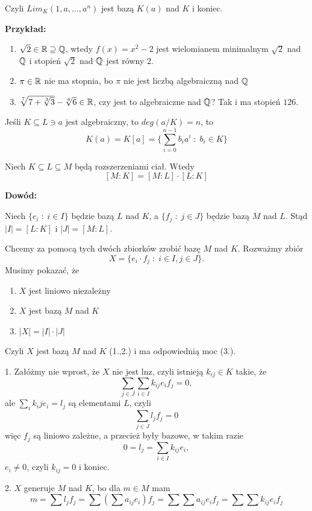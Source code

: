 Czyli $Lim_K(1,a,...,a^n)$ jest bazą $K(a)$ nad $K$ i koniec.

\textbf{Przykład:}
\begin{enumerate}
    \item $\sqrt{2}\in\mathbb{R}\supseteq\mathbb{Q}$, wtedy $f(x)=x^2-2$ jest wielomianem minimalnym $\sqrt2$ nad $\mathbb{Q}$ i stopień $\sqrt{2}$ nad $\mathbb{Q}$ jest równy $2$.
    \item $\pi\in\mathbb{R}$ nie ma stopnia, bo $\pi$ nie jest liczbą algebraiczną nad $\mathbb{Q}$
    \item  $\sqrt[7]{7+\sqrt[3]{3}}-\sqrt[6]{6}\in\mathbb{R}$, czy jest to algebraiczne nad $\mathbb{Q}$? Tak i ma stopień $126$.
\end{enumerate}

Jeśli $K\subseteq L\ni a$ jest algebraiczny, to $deg(a/K)=n$, to 
$$K(a)=K[a]=\{\sum\limits_{i=0}^{n-1}b_ia^i\;:\;b_i\in K\}$$

\begin{fakt}[$dim_K(M)=dim_L(M)\cdot dim_K(L)$]\label{fakt:4:5}
    Niech $K\subseteq L\subseteq M$ będą rozszerzeniami ciał. Wtedy 
    $$[M:K]=[M:L]\cdot [L:K]$$
\end{fakt}

\textbf{Dowód:}

Niech $\{e_i\;:\;i\in I\}$ będzie bazą $L$ nad $K$, a $\{f_j\;:\;j\in J\}$ będzie bazą $M$ nad $L$. Stąd $|I|=[L:K]$ i $|J|=[M:L]$.

Chcemy za pomocą tych dwóch zbiorków zrobić bazę $M$ nad $K$. Rozważmy zbiór
$$X=\{e_i\cdot f_j\;:\;i\in I,j\in J\}.$$
Musimy pokazać, że 
\begin{enumerate}
    \item $X$ jest liniowo niezależny
    \item $X$ jest bazą $M$ nad $K$
    \item $|X|=|I|\cdot|J|$
\end{enumerate}

Czyli $X$ jest bazą $M$ nad $K$ (1.,2.) i ma odpowiednią moc (3.).

1. Załóżmy nie wprost, że $X$ nie jest lnz, czyli istnieją $k_{ij}\in K$ takie, że
$$\sum\limits_{j\in J}\sum\limits_{i\in I}k_{ij}e_if_j=0,$$
ale $\sum\limits_ik_ije_i=l_j$ są elementami $L$, czyli
$$\sum\limits_{j\in J}l_jf_j=0$$
więc $f_j$ są liniowo zależne, a przecież były bazowe, w takim razie
$$0=l_j=\sum\limits_{i\in I}k_{ij}e_i,$$
$e_i\neq0$, czyli $k_{ij}=0$ i koniec.

2. $X$ generuje $M$ nad $K$, bo dla $m\in M$ mam
$$m=\sum l_jf_j=\sum\left(\sum a_{ij}e_i\right)f_j=\sum\sum a_{ij}e_if_j=\sum \sum k_{ij}e_if_j$$

